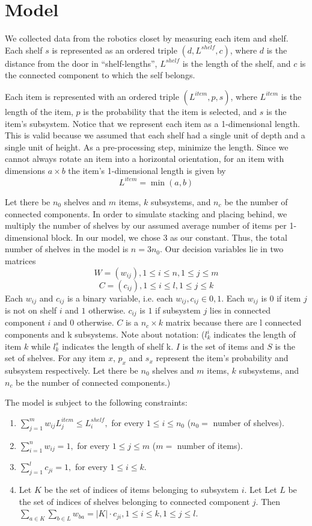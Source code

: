 \documentclass[10pt]{article}
\theoremstyle{named}
\begin{document}
\section{Model}
We collected data from the robotics closet by measuring each item and shelf. Each
shelf $s$ is represented as an ordered triple $(d, L^{shelf}, c)$, where $d$ is the
distance from the door in ``shelf-lengths'', $L^{shelf}$ is the length of the shelf, and
$c$ is the connected component to which the self belongs.
\par
Each item is represented with an ordered triple $(L^{item}, p, s)$, where $L^{item}$ is the length
of the item, $p$ is the probability that the item is selected, and $s$ is the item's
subsystem. Notice that we represent each item as a 1-dimensional length. This is valid
because we assumed that each shelf had a single unit of depth and a single
unit of height. As a pre-processing step, minimize the length. Since we cannot always
rotate an item into a horizontal orientation, for an item with dimensions $a \times b$
the item's 1-dimensional length is given by 
$$L^{item} = \min(a, b)$$
\par
Let there be $n_0$ shelves and $m$ items, $k$ subsystems, and $n_c$ be the number of
connected components. In order to simulate stacking and placing behind, we
multiply the number of shelves by our assumed average number of items per
1-dimensional block. In our model, we chose 3 as our constant. Thus,
the total number of shelves in the model is $n = 3n_0$. 
Our decision variables lie in two matrices
$$W = (w_{ij}), 1 \leq i \leq n, 1 \leq j \leq m$$
$$C = (c_{ij}), 1 \leq i \leq l, 1 \leq j \leq k$$
Each $w_{ij}$ and $c_{ij}$ is a binary variable, i.e. each $w_{ij}, c_{ij} \in {0, 1}$.
Each $w_{ij}$ is $0$ if item $j$ is not on shelf $i$ and $1$ otherwise. $c_{ij}$ is
$1$ if subsystem $j$ lies in connected component $i$ and $0$ otherwise. 
$C$ is a $n_c \times k$ matrix because there are l connected components and k subsystems. 
Note about notation: ($l^i_k$ indicates the length of item $k$ while $l^s_k$ indicates the
length of shelf k. $I$ is the set of items and $S$ is the set of shelves. For any item
$x$, $p_x$ and $s_x$ represent the item's probability and subsystem respectively. Let
there be $n_0$ shelves and $m$ items, $k$ subsystems, and $n_c$ be the number of 
connected components.)
\par
The model is subject to the following constraints:
\begin{enumerate}
\item $\sum_{j = 1}^{m}w_{ij} L^{item}_j \leq L^{shelf}_i, $ for every $1 \leq i \leq n_0$ ($n_0 = $ number of shelves).
\item $\sum_{i = 1}^{n}w_{ij} = 1, $ for every $1 \leq j \leq m$ ($m = $ number of items).
\item $\sum_{j = 1}^{l}c_{ji} = 1, $ for every $1 \leq i \leq k$.
\item Let $K$ be the set of indices of items belonging to subsystem $i$. Let
  Let $L$ be the set of indices of shelves belonging to connected component $j$.
  Then $\sum_{a \in K}\sum_{b \in L}w_{ba} = |K| \cdot c_{ji}, 1 \leq i \leq k, 1 \leq j \leq l$.
\end{enumerate}
\end{document}
